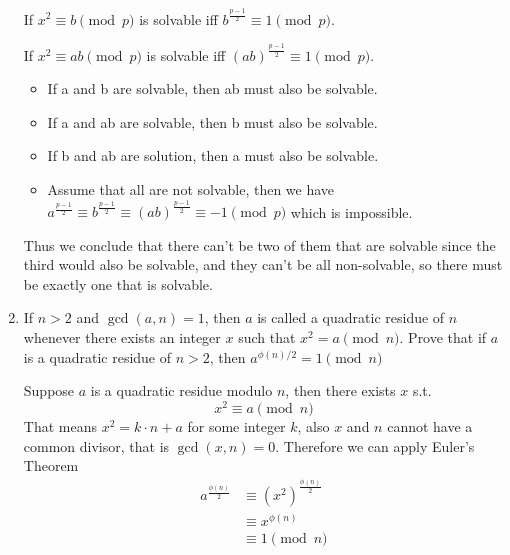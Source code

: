 \documentclass[12pt]{exam}
\theoremstyle{definition}
\begin{document}
\begin{enumerate}
\begin{answer}
            If $x^2 \equiv b \pmod p$ is solvable iff $b^{\frac{p-1}{2}} \equiv 1 \pmod p$.

            If $x^2 \equiv ab \pmod p$ is solvable iff ${(ab)}^{\frac{p-1}{2}} \equiv 1 \pmod p$.

            \begin{itemize}
                \item If a and b are solvable, then ab must also be solvable.
                \item If a and ab are solvable, then b must also be solvable.
                \item If b and ab are solution, then a must also be solvable.
                \item Assume that all are not solvable, then we have
                $a^{\frac{p-1}{2}} \equiv b^{\frac{p-1}{2}} \equiv {(ab)}^{\frac{p-1}{2}} \equiv -1 \pmod p$
                which is impossible.
            \end{itemize}

            Thus we conclude that there can't be two of them that are solvable since the third would also be solvable, and they can't be all non-solvable,
            so there must be exactly one that is solvable.
        \end{answer}

    \setcounter{enumi}{11}
    \item If $n > 2$ and $\gcd(a, n) = 1$, then $a$ is called a quadratic residue of $n$ whenever there exists
    an integer $x$ such that $x^2 = a \pmod n$. Prove that if $a$ is a quadratic residue of $n > 2$,
    then $a^{\phi(n)/2} = 1 \pmod n$
        \begin{answer}
            Suppose $a$ is a quadratic residue modulo $n$, then there exists $x$ s.t.
            \[
                x^2 \equiv a \pmod n
            \]
            That means $x^2 = k \cdot n + a$ for some integer $k$, also $x$ and $n$ cannot have a common divisor, that is $\gcd(x, n) = 0$.
            Therefore we can apply Euler's Theorem
            \[
                \begin{aligned}
                    a^{\frac{\phi(n)}{2}} &\equiv {(x^2)}^{\frac{\phi(n)}{2}} \\
                    &\equiv x^{\phi(n)} \\
                    &\equiv 1 \pmod n
                \end{aligned}
            \]
        \end{answer}

\end{enumerate}
\end{document}
